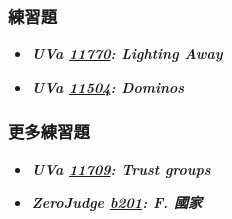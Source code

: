 \subsubsection*{練習題}
\begin{itemize}[label={\Checkmark}]
\item \textbf{\textit{UVa \href{http://uva.onlinejudge.org/external/117/11770.html}{11770}: Lighting Away}}\\

\item \textbf{\textit{UVa \href{http://uva.onlinejudge.org/external/115/11504.html}{11504}: Dominos}}\\

\end{itemize}
\subsubsection*{更多練習題}
\begin{itemize}[label={\PencilLeftDown}]
\item \textbf{\textit{UVa \href{http://uva.onlinejudge.org/external/117/11709.html}{11709}: Trust groups}}
\item \textbf{\textit{ZeroJudge \href{http://zerojudge.tw/ShowProblem?problemid=b201}{b201}: F. 國家}}
\end{itemize}